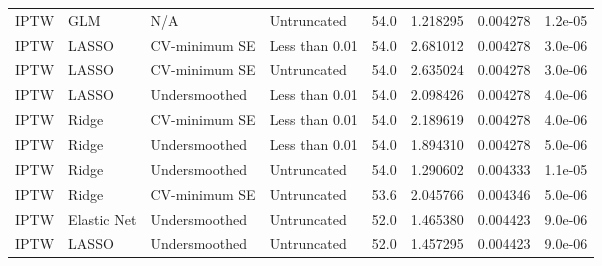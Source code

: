 \begin{longtable}[l]{llllllll}
IPTW & GLM & N/A & Untruncated & 54.0 & 1.218295 & 0.004278 & 1.2e-05\\
IPTW & LASSO & CV-minimum SE & Less than 0.01 & 54.0 & 2.681012 & 0.004278 & 3.0e-06\\
IPTW & LASSO & CV-minimum SE & Untruncated & 54.0 & 2.635024 & 0.004278 & 3.0e-06\\
IPTW & LASSO & Undersmoothed & Less than 0.01 & 54.0 & 2.098426 & 0.004278 & 4.0e-06\\
IPTW & Ridge & CV-minimum SE & Less than 0.01 & 54.0 & 2.189619 & 0.004278 & 4.0e-06\\
IPTW & Ridge & Undersmoothed & Less than 0.01 & 54.0 & 1.894310 & 0.004278 & 5.0e-06\\
IPTW & Ridge & Undersmoothed & Untruncated & 54.0 & 1.290602 & 0.004333 & 1.1e-05\\
IPTW & Ridge & CV-minimum SE & Untruncated & 53.6 & 2.045766 & 0.004346 & 5.0e-06\\
IPTW & Elastic Net & Undersmoothed & Untruncated & 52.0 & 1.465380 & 0.004423 & 9.0e-06\\
IPTW & LASSO & Undersmoothed & Untruncated & 52.0 & 1.457295 & 0.004423 & 9.0e-06\\
\bottomrule
\end{longtable}
